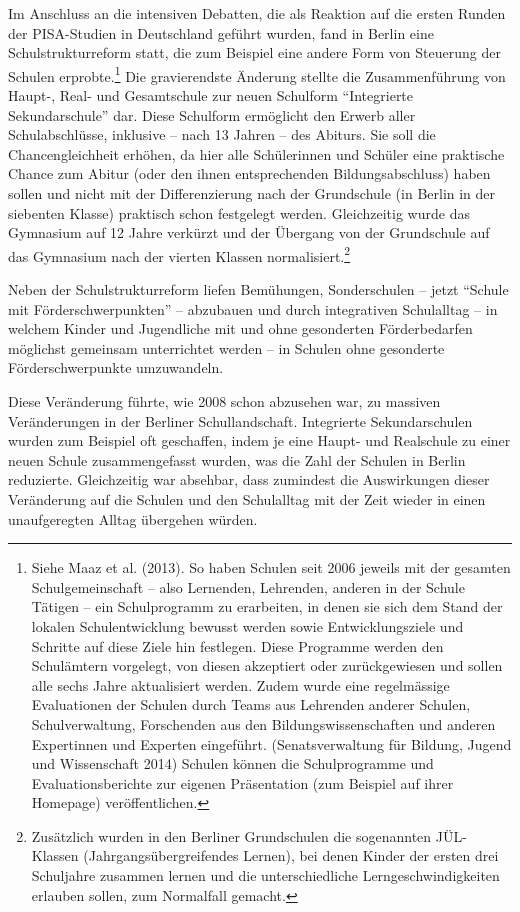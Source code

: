 \documentclass[a4paper,
fontsize=11pt,
oneside,
numbers=noperiodatend,
parskip=half-,
bibliography=totoc,
final
]{scrartcl}
\begin{document}
Im Anschluss an die intensiven Debatten, die als Reaktion auf die ersten
Runden der PISA-Studien in Deutschland geführt wurden, fand in Berlin
eine Schulstrukturreform statt, die zum Beispiel eine andere Form von
Steuerung der Schulen erprobte.\footnote{Siehe Maaz et al. (2013). So
  haben Schulen seit 2006 jeweils mit der gesamten Schulgemeinschaft --
  also Lernenden, Lehrenden, anderen in der Schule Tätigen -- ein
  Schulprogramm zu erarbeiten, in denen sie sich dem Stand der lokalen
  Schulentwicklung bewusst werden sowie Entwicklungsziele und Schritte
  auf diese Ziele hin festlegen. Diese Programme werden den Schulämtern
  vorgelegt, von diesen akzeptiert oder zurückgewiesen und sollen alle
  sechs Jahre aktualisiert werden. Zudem wurde eine regelmässige
  Evaluationen der Schulen durch Teams aus Lehrenden anderer Schulen,
  Schulverwaltung, Forschenden aus den Bildungswissenschaften und
  anderen Expertinnen und Experten eingeführt. (Senatsverwaltung für
  Bildung, Jugend und Wissenschaft 2014) Schulen können die
  Schulprogramme und Evaluationsberichte zur eigenen Präsentation (zum
  Beispiel auf ihrer Homepage) veröffentlichen.} Die gravierendste
Änderung stellte die Zusammenführung von Haupt-, Real- und Gesamtschule
zur neuen Schulform \enquote{Integrierte Sekundarschule} dar. Diese
Schulform ermöglicht den Erwerb aller Schulabschlüsse, inklusive -- nach
13 Jahren -- des Abiturs. Sie soll die Chancengleichheit erhöhen, da
hier alle Schülerinnen und Schüler eine praktische Chance zum Abitur
(oder den ihnen entsprechenden Bildungsabschluss) haben sollen und nicht
mit der Differenzierung nach der Grundschule (in Berlin in der siebenten
Klasse) praktisch schon festgelegt werden. Gleichzeitig wurde das
Gymnasium auf 12 Jahre verkürzt und der Übergang von der Grundschule auf
das Gymnasium nach der vierten Klassen normalisiert.\footnote{Zusätzlich
  wurden in den Berliner Grundschulen die sogenannten JÜL-Klassen
  (Jahrgangsübergreifendes Lernen), bei denen Kinder der ersten drei
  Schuljahre zusammen lernen und die unterschiedliche
  Lerngeschwindigkeiten erlauben sollen, zum Normalfall gemacht.}

Neben der Schulstrukturreform liefen Bemühungen, Sonderschulen -- jetzt
\enquote{Schule mit Förderschwerpunkten} -- abzubauen und durch
integrativen Schulalltag -- in welchem Kinder und Jugendliche mit und
ohne gesonderten Förderbedarfen möglichst gemeinsam unterrichtet werden
-- in Schulen ohne gesonderte Förderschwerpunkte umzuwandeln.

Diese Veränderung führte, wie 2008 schon abzusehen war, zu massiven
Veränderungen in der Berliner Schullandschaft. Integrierte
Sekundarschulen wurden zum Beispiel oft geschaffen, indem je eine Haupt-
und Realschule zu einer neuen Schule zusammengefasst wurden, was die
Zahl der Schulen in Berlin reduzierte. Gleichzeitig war absehbar, dass
zumindest die Auswirkungen dieser Veränderung auf die Schulen und den
Schulalltag mit der Zeit wieder in einen unaufgeregten Alltag übergehen
würden.
\end{document}
